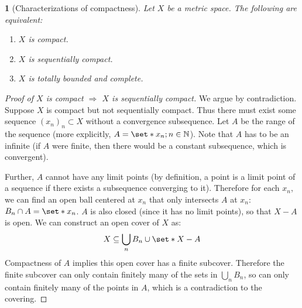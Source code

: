 \documentclass[11pt]{article}
\numberwithin{equation}{section}
\theoremstyle{plain}
\newtheorem{theorem}{\color{ForestGreen}{\textbf{Theorem}}}[section]
\theoremstyle{definition}
\def\Set{\set*}%
\def\ss{\subset}
\def\imp{\Rightarrow}
\newcommand{\1}{\mathbbm 1}
\newcommand{\NN}{\mathbb N}
\begin{document}
\begin{theorem}[Characterizations of compactness]
	Let $X$ be a metric space. The following are equivalent:
	\begin{enumerate}
		\item $X$ is compact.
		\item $X$ is sequentially compact.
		\item $X$ is totally bounded and complete. 
	\end{enumerate}
\end{theorem}

\begin{proof}[Proof of $X$ is compact $\imp$ $X$ is sequentially compact]
	We argue by contradiction. Suppose $X$ is compact but not sequentially compact. Thus there must exist some sequence $(x_n)_n \ss X$ without a convergence subsequence. Let $A$ be the range of the sequence (more explicitly, $A = \Set{x_n; n \in \NN}$). Note that $A$ has to be an infinite (if $A$ were finite, then there would be a constant subsequence, which is convergent). 

	Further, $A$ cannot have any limit points (by definition, a point is a limit point of a sequence if there exists a subsequence converging to it). Therefore for each $x_n$, we can find an open ball centered at $x_n$ that only intersects $A$ at $x_n$: $B_n \cap A = \Set{x_n}$. $A$ is also closed (since it has no limit points), so that $X-A$ is open. We can construct an open cover of $X$ as:
	\begin{equation}
		X \subseteq \bigcup_{n} B_n \cup \Set{X-A}
	\end{equation}
	Compactness of $A$ implies this open cover has a finite subcover. Therefore the finite subcover can only contain finitely many of the sets in $\bigcup_{n} B_n$, so can only contain finitely many of the points in $A$, which is a contradiction to the covering. 
\end{proof}
\end{document}
